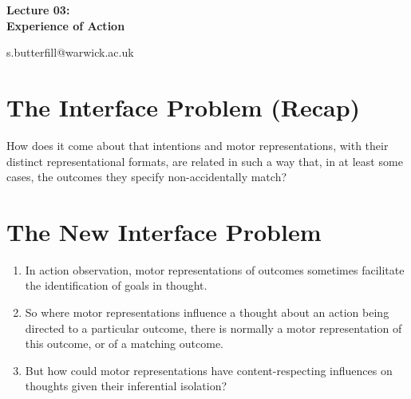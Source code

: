\documentclass[12pt]{extarticle}
\date{}
\makeatletter
\def \ititle {Origins of Mind}
\def \iemail{s.butterfill@warwick.ac.uk}
\makeatother
\begin{document}
\begin{multicols*}{3}

\setlength\footnotesep{1em}









      
\def \ititle {Lecture 03: \\ Experience of Action}
 
\begin{center}
 
{\Large
 
\textbf{\ititle}
 
}
 
 
 
\iemail %
 
\end{center}
 
 
 
\section{The Interface Problem (Recap)}
 
How does it come about that intentions and motor representations, with their distinct
representational formats, are related in such a way that, in at least some cases, the outcomes they
specify non-accidentally match?

 
 
\section{The New Interface Problem}

\begin{enumerate} 
\item In action observation, motor representations of outcomes
sometimes facilitate the identification of goals in thought.

\item So where motor representations influence a thought about an action being directed to a particular outcome, there is normally a motor representation of this outcome, or of a matching outcome.

\item But how could motor representations have content-respecting influences on thoughts given their inferential isolation?
\end{enumerate}
 

\end{multicols*}
\end{document}
